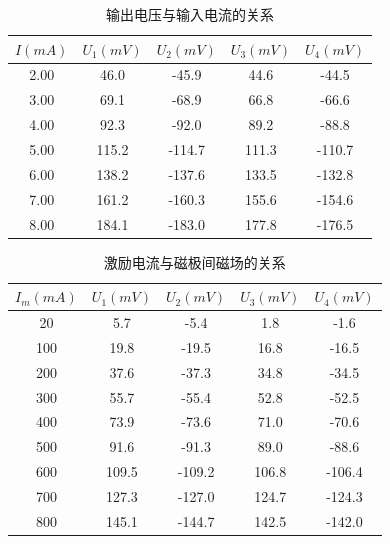 \documentclass[12pt]{article}
\begin{document}
\begin{table}[H]
    \centering
    \begin{tabular}{|c|c|c|c|c|}
    \hline
    $I(mA)$ & $U_1(mV)$ & $U_2(mV)$ & $U_3(mV)$ & $U_4(mV)$ \\ \hline
    2.00    & 46.0      & -45.9     & 44.6      & -44.5     \\ \hline
    3.00    & 69.1      & -68.9     & 66.8      & -66.6     \\ \hline
    4.00    & 92.3      & -92.0     & 89.2      & -88.8     \\ \hline
    5.00    & 115.2     & -114.7    & 111.3     & -110.7    \\ \hline
    6.00    & 138.2     & -137.6    & 133.5     & -132.8    \\ \hline
    7.00    & 161.2     & -160.3    & 155.6     & -154.6    \\ \hline
    8.00    & 184.1     & -183.0    & 177.8     & -176.5    \\ \hline
    \end{tabular}
    \caption{输出电压与输入电流的关系}
    \label{tab:a1}
\end{table}

\begin{table}[H]
    \centering
    \begin{tabular}{|c|c|c|c|c|}
    \hline
    $I_m(mA)$ & $U_1(mV)$ & $U_2(mV)$ & $U_3(mV)$ & $U_4(mV)$ \\ \hline
    20        & 5.7       & -5.4      & 1.8       & -1.6      \\ \hline
    100       & 19.8      & -19.5     & 16.8      & -16.5     \\ \hline
    200       & 37.6      & -37.3     & 34.8      & -34.5     \\ \hline
    300       & 55.7      & -55.4     & 52.8      & -52.5     \\ \hline
    400       & 73.9      & -73.6     & 71.0      & -70.6     \\ \hline
    500       & 91.6      & -91.3     & 89.0      & -88.6     \\ \hline
    600       & 109.5     & -109.2    & 106.8     & -106.4    \\ \hline
    700       & 127.3     & -127.0    & 124.7     & -124.3    \\ \hline
    800       & 145.1     & -144.7    & 142.5     & -142.0    \\ \hline
    \end{tabular}
    \caption{激励电流与磁极间磁场的关系}
    \label{tab:a2}
\end{table}
\end{document}
